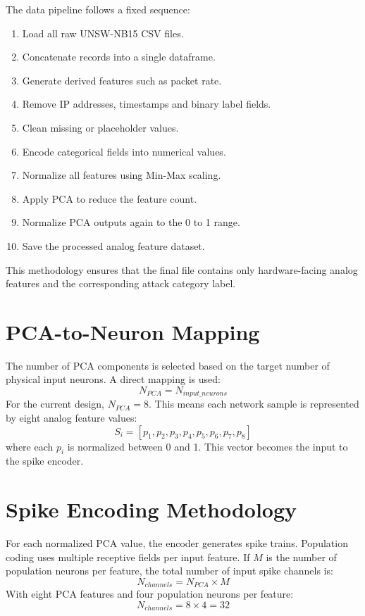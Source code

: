 The data pipeline follows a fixed sequence:
\begin{enumerate}
\item Load all raw UNSW-NB15 CSV files.
\item Concatenate records into a single dataframe.
\item Generate derived features such as packet rate.
\item Remove IP addresses, timestamps and binary label fields.
\item Clean missing or placeholder values.
\item Encode categorical fields into numerical values.
\item Normalize all features using Min-Max scaling.
\item Apply PCA to reduce the feature count.
\item Normalize PCA outputs again to the 0 to 1 range.
\item Save the processed analog feature dataset.
\end{enumerate}

This methodology ensures that the final file contains only hardware-facing analog features and the corresponding attack category label.

\section{PCA-to-Neuron Mapping}

The number of PCA components is selected based on the target number of physical input neurons. A direct mapping is used:
\begin{equation}
N_{PCA} = N_{input\_neurons}
\end{equation}
For the current design, $N_{PCA}=8$. This means each network sample is represented by eight analog feature values:
\begin{equation}
S_i = [p_1, p_2, p_3, p_4, p_5, p_6, p_7, p_8]
\end{equation}
where each $p_i$ is normalized between 0 and 1. This vector becomes the input to the spike encoder.

\section{Spike Encoding Methodology}

For each normalized PCA value, the encoder generates spike trains. Population coding uses multiple receptive fields per input feature. If $M$ is the number of population neurons per feature, the total number of input spike channels is:
\begin{equation}
N_{channels} = N_{PCA} \times M
\end{equation}
With eight PCA features and four population neurons per feature:
\begin{equation}
N_{channels} = 8 \times 4 = 32
\end{equation}

